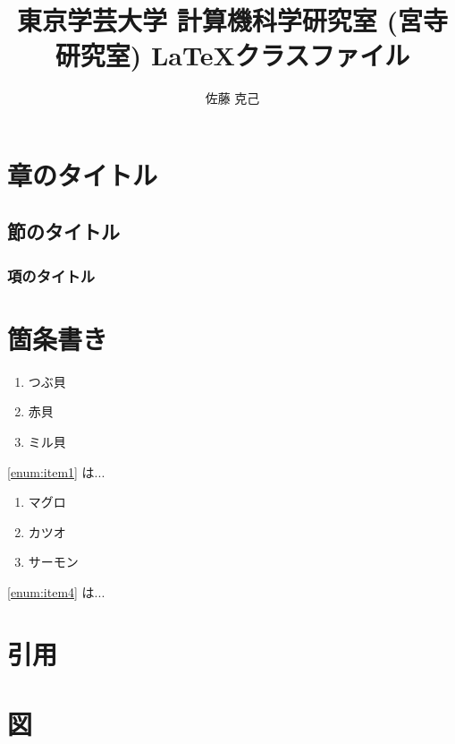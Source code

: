 \documentclass[dvipdfmx]{miyalab}
\title{東京学芸大学 計算機科学研究室 (宮寺研究室) \LaTeX クラスファイル}
\affiliation{宮寺研究室}
\author{佐藤 克己}
\begin{document}
\maketitle

\section{章のタイトル}
\subsection{節のタイトル}
\subsubsection{項のタイトル}

\section{箇条書き}

\begin{enumerate}[labelindent=1\parindent,leftmargin=*,label=第\arabic{enumi}位.,ref=\arabic{enumi}]
		\item つぶ貝\label{enum:item1}
		\item 赤貝\label{enum:item2}
		\item ミル貝\label{enum:item3}
\end{enumerate}

\ref{enum:item1} は...

\begin{enumerate}[labelindent=2\parindent,leftmargin=*,label=第\arabic{enumi}位.,ref=お寿司 その\arabic{enumi}]
		\item マグロ\label{enum:item4}
		\item カツオ\label{enum:item5}
		\item サーモン\label{enum:item6}
\end{enumerate}

\ref{enum:item4} は...

\section{引用}

\cite{miyalab-cls}

\cite{latex2e}

\section{図}
\end{document}
